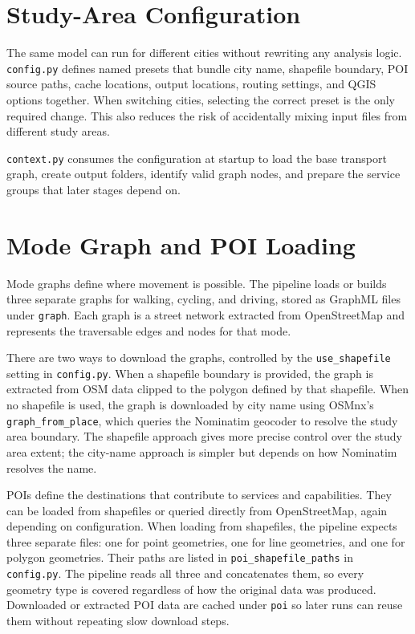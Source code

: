 \documentclass[11pt]{article}
\begin{document}
\section{Study-Area Configuration}

The same model can run for different cities without rewriting any analysis logic. \texttt{config.py} defines named presets that bundle city name, shapefile boundary, POI source paths, cache locations, output locations, routing settings, and QGIS options together. When switching cities, selecting the correct preset is the only required change. This also reduces the risk of accidentally mixing input files from different study areas.

\texttt{context.py} consumes the configuration at startup to load the base transport graph, create output folders, identify valid graph nodes, and prepare the service groups that later stages depend on.

\section{Mode Graph and POI Loading}

Mode graphs define where movement is possible. The pipeline loads or builds three separate graphs for walking, cycling, and driving, stored as GraphML files under \texttt{graph}. Each graph is a street network extracted from OpenStreetMap and represents the traversable edges and nodes for that mode.

There are two ways to download the graphs, controlled by the \texttt{use\_shapefile} setting in \texttt{config.py}. When a shapefile boundary is provided, the graph is extracted from OSM data clipped to the polygon defined by that shapefile. When no shapefile is used, the graph is downloaded by city name using OSMnx's \texttt{graph\_from\_place}, which queries the Nominatim geocoder to resolve the study area boundary. The shapefile approach gives more precise control over the study area extent; the city-name approach is simpler but depends on how Nominatim resolves the name.

POIs define the destinations that contribute to services and capabilities. They can be loaded from shapefiles or queried directly from OpenStreetMap, again depending on configuration. When loading from shapefiles, the pipeline expects three separate files: one for point geometries, one for line geometries, and one for polygon geometries. Their paths are listed in \texttt{poi\_shapefile\_paths} in \texttt{config.py}. The pipeline reads all three and concatenates them, so every geometry type is covered regardless of how the original data was produced. Downloaded or extracted POI data are cached under \texttt{poi} so later runs can reuse them without repeating slow download steps.
\end{document}

